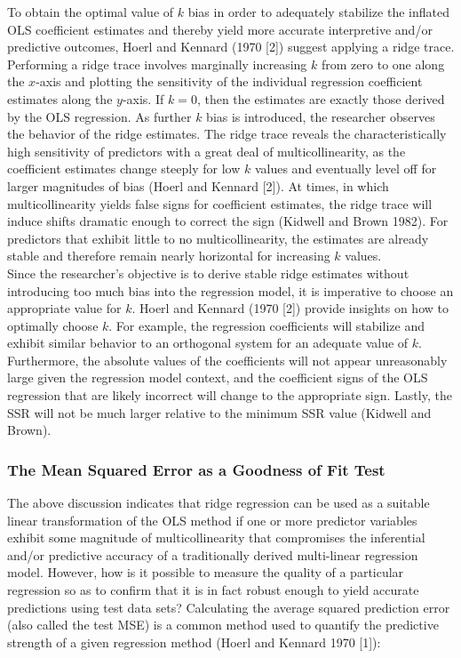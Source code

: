 \noindent To obtain the optimal value of $k$ bias in order to adequately stabilize the inflated OLS coefficient estimates and thereby yield more accurate interpretive and/or predictive outcomes, Hoerl and Kennard (1970 [2]) suggest applying a ridge trace. Performing a ridge trace involves marginally increasing $k$ from zero to one along the $x$-axis and plotting the sensitivity of the individual regression coefficient estimates along the $y$-axis. If $k=0$, then the estimates are exactly those derived by the OLS regression. As further $k$ bias is introduced, the researcher observes the behavior of the ridge estimates. The ridge trace reveals the characteristically high sensitivity of predictors with a great deal of multicollinearity, as the coefficient estimates change steeply for low $k$ values and eventually level off for larger magnitudes of bias (Hoerl and Kennard [2]). At times, in which multicollinearity yields false signs for coefficient estimates, the ridge trace will induce shifts dramatic enough to correct the sign (Kidwell and Brown 1982). For predictors that exhibit little to no multicollinearity, the estimates are already stable and therefore remain nearly horizontal for increasing $k$ values. \\

\noindent Since the researcher's objective is to derive stable ridge estimates without introducing too much bias into the regression model, it is imperative to choose an appropriate value for $k$. Hoerl and Kennard (1970 [2]) provide insights on how to optimally choose $k$. For example, the regression coefficients will stabilize and exhibit similar behavior to an orthogonal system for an adequate value of $k$. Furthermore, the absolute values of the coefficients will not appear unreasonably large given the regression model context, and the coefficient signs of the OLS regression that are likely incorrect will change to the appropriate sign. Lastly, the SSR will not be much larger relative to the minimum SSR value (Kidwell and Brown). 

\subsubsection{The Mean Squared Error as a Goodness of Fit Test}

\noindent The above discussion indicates that ridge regression can be used as a suitable linear transformation of the OLS method if one or more predictor variables exhibit some magnitude of multicollinearity that compromises the inferential and/or predictive accuracy of a traditionally derived multi-linear regression model. However, how is it possible to measure the quality of a particular regression so as to confirm that it is in fact robust enough to yield accurate predictions using test data sets? Calculating the average squared prediction error (also called the test MSE) is a common method used to quantify the predictive strength of a given regression method (Hoerl and Kennard 1970 [1]): 

